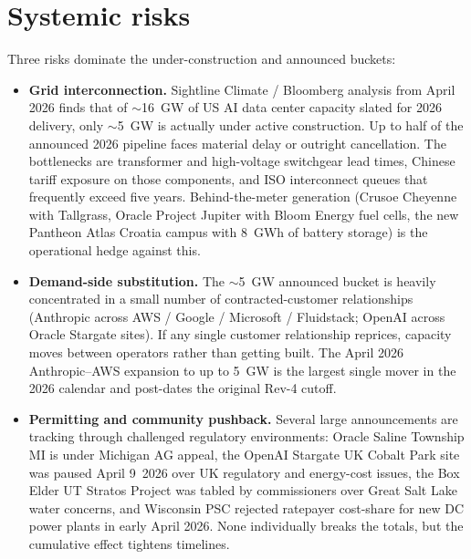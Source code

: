 \documentclass[11pt]{article}
\begin{document}
\section{Systemic risks}\label{sec:risk}
\noindent Three risks dominate the under-construction and announced buckets:
\begin{itemize}
\item \textbf{Grid interconnection.} Sightline Climate / Bloomberg analysis from April 2026 finds that of $\sim$16~GW of US AI data center capacity slated for 2026 delivery, only $\sim$5~GW is actually under active construction. Up to half of the announced 2026 pipeline faces material delay or outright cancellation. The bottlenecks are transformer and high-voltage switchgear lead times, Chinese tariff exposure on those components, and ISO interconnect queues that frequently exceed five years. Behind-the-meter generation (Crusoe Cheyenne with Tallgrass, Oracle Project Jupiter with Bloom Energy fuel cells, the new Pantheon Atlas Croatia campus with 8~GWh of battery storage) is the operational hedge against this.
\item \textbf{Demand-side substitution.} The $\sim$5~GW announced bucket is heavily concentrated in a small number of contracted-customer relationships (Anthropic across AWS / Google / Microsoft / Fluidstack; OpenAI across Oracle Stargate sites). If any single customer relationship reprices, capacity moves between operators rather than getting built. The April 2026 Anthropic--AWS expansion to up to 5~GW is the largest single mover in the 2026 calendar and post-dates the original Rev-4 cutoff.
\item \textbf{Permitting and community pushback.} Several large announcements are tracking through challenged regulatory environments: Oracle Saline Township MI is under Michigan AG appeal, the OpenAI Stargate UK Cobalt Park site was paused April 9~2026 over UK regulatory and energy-cost issues, the Box Elder UT Stratos Project was tabled by commissioners over Great Salt Lake water concerns, and Wisconsin PSC rejected ratepayer cost-share for new DC power plants in early April 2026. None individually breaks the totals, but the cumulative effect tightens timelines.
\end{itemize}
\end{document}
